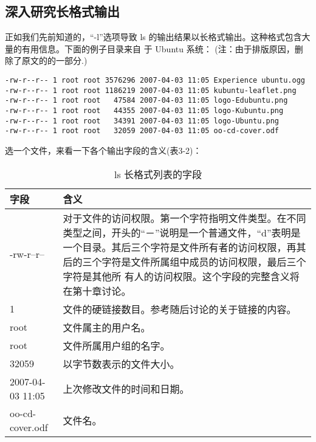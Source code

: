 \subsection{深入研究长格式输出}
正如我们先前知道的，“-l”选项导致 ls 的输出结果以长格式输出。这种格式包含大量的有用信息。下面的例子目录来自 于 Ubuntu 系统：
(注：由于排版原因，删除了原文的的一部分.)
\begin{lstlisting}
-rw-r--r-- 1 root root 3576296 2007-04-03 11:05 Experience ubuntu.ogg
-rw-r--r-- 1 root root 1186219 2007-04-03 11:05 kubuntu-leaflet.png 
-rw-r--r-- 1 root root   47584 2007-04-03 11:05 logo-Edubuntu.png 
-rw-r--r-- 1 root root   44355 2007-04-03 11:05 logo-Kubuntu.png
-rw-r--r-- 1 root root   34391 2007-04-03 11:05 logo-Ubuntu.png
-rw-r--r-- 1 root root   32059 2007-04-03 11:05 oo-cd-cover.odf
\end{lstlisting}

\par 选一个文件，来看一下各个输出字段的含义(表3-2)：

\begin{table}[ht!]
\caption{ls 长格式列表的字段}
\label{table_example}
\centering
\begin{tabular}{p{4cm}p{11cm}}
\hline
 字段 & 含义 \\
 \hline 
 -rw-r--r--	& 对于文件的访问权限。第一个字符指明文件类型。在不同类型之间，开头的“－”说明是一个普通文件，“d”表明是一个目录。其后三个字符是文件所有者的访问权限，再其后的三个字符是文件所属组中成员的访问权限，最后三个字符是其他所 有人的访问权限。这个字段的完整含义将在第十章讨论。\\
1 & 文件的硬链接数目。参考随后讨论的关于链接的内容。 \\
root & 文件属主的用户名。 \\
root & 文件所属用户组的名字。 \\
32059 & 以字节数表示的文件大小。\\
2007-04-03 11:05 & 上次修改文件的时间和日期。 \\
oo-cd-cover.odf	& 文件名。 \\
\hline

\end{tabular}
\end{table}